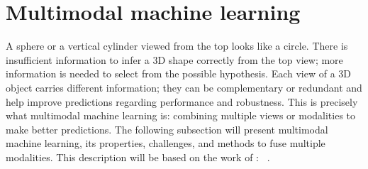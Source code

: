 \documentclass[../main.tex]{subfiles}
\begin{document}
\section{Multimodal machine learning}
	A sphere or a vertical cylinder viewed from the top looks like a circle.
	There is insufficient information to infer a 3D shape correctly from the top view; more information is needed to select from the possible hypothesis.
	Each view of a 3D object carries different information; they can be complementary or redundant and help improve predictions regarding performance and robustness.
	This is precisely what multimodal machine learning is: combining multiple views or modalities to make better predictions.
	The following subsection will present multimodal machine learning, its properties, challenges, and methods to fuse multiple modalities.
	This description will be based on the work of \citeauthor{MML_morency}: ~\cite{MML_morency}.
\end{document}
